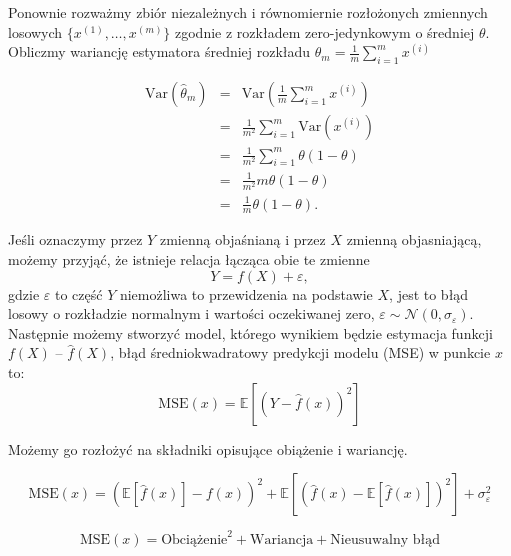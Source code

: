 \documentclass[11pt]{book}
\theoremstyle{definition}
\begin{document}
\noindent Ponownie rozważmy zbiór niezależnych i równomiernie rozłożonych zmiennych losowych $\{{ x^{(1)}, \dots, x^{(m)} }\}$ zgodnie z rozkładem zero-jedynkowym o średniej $\theta$. Obliczmy wariancję estymatora średniej rozkładu $\theta_m = \frac{1}{m} \sum_{i=1}^m x^{(i)}$


\begin{eqnarray}
\text{Var}\left(\hat{\theta}_m\right) &=& \text{Var}\left( \frac{1}{m} \sum_{i=1}^m x^{(i)} \right) \nonumber \\
&=& \frac{1}{m^2} \sum_{i=1}^m   \text{Var} \left( x^{(i)} \right) \nonumber \\
&=& \frac{1}{m^2} \sum_{i=1}^m   \theta \left( 1-\theta \right) \nonumber \\
&=& \frac{1}{m^2} m \theta \left( 1-\theta \right) \nonumber \\
&=& \frac{1}{m} \theta \left( 1-\theta \right).
\end{eqnarray}
%











Jeśli oznaczymy przez $Y$ zmienną objaśnianą i przez $X$ zmienną objasniającą, możemy przyjąć, że istnieje relacja łącząca obie te zmienne
%
\begin{equation}
 Y = f(X) + \varepsilon,
\end{equation}
%
gdzie $\varepsilon$ to część $Y$ niemożliwa to przewidzenia na podstawie $X$, jest to błąd losowy o rozkładzie normalnym i wartości oczekiwanej zero,  $\varepsilon \sim \mathcal{N}(0, \sigma_{\varepsilon})$. Następnie możemy stworzyć model, którego wynikiem będzie estymacja funkcji $f(X)$ -- $\hat{f}(X)$, błąd średniokwadratowy predykcji modelu (MSE) w punkcie $x$ to:
%
\begin{equation}
\text{MSE}(x) = \mathbb{E} \left[ \left(Y - \hat{f}(x)\right)^2  \right] 
\end{equation}

Możemy go rozłożyć na składniki opisujące obiążenie i wariancję.

\begin{equation}
\text{MSE}(x) =  \left(  \mathbb{E}\left[\hat{f}(x)\right] - f(x) \right)^2 +  \mathbb{E} \left[ \left(\hat{f}(x) - \mathbb{E}\left[ \hat{f}(x)\right]\right)^2  \right]  + \sigma^2_{\varepsilon}
\end{equation}

$$
\text{MSE}(x) = \text{Obciążenie}^2 + \text{Wariancja} + \text{Nieusuwalny błąd}
$$
\end{document}
